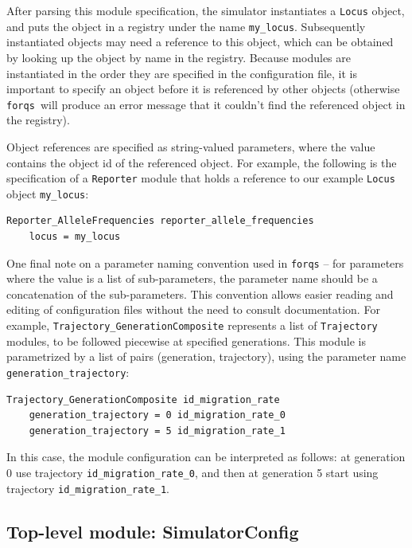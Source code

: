 \documentclass{article}
\newcommand{\forqs}[0]{\texttt{forqs }}
\begin{document}
After parsing this module specification, the simulator instantiates a
\texttt{Locus} object, and puts the object in a registry under the name
\texttt{my\_locus}.  Subsequently instantiated objects may need a reference to
this object, which can be obtained by looking up the object by name in the
registry.  Because modules are instantiated in the order they are specified in
the configuration file, it is important to specify an object before it is
referenced by other objects (otherwise \forqs will produce an error message
that it couldn't find the referenced object in the registry).

Object references are specified as string-valued parameters, where the value
contains the object id of the referenced object.  For example, the following is
the specification of a \texttt{Reporter} module that holds a reference to our
example \texttt{Locus} object \texttt{my\_locus}:
\begin{small}
\begin{verbatim}
Reporter_AlleleFrequencies reporter_allele_frequencies
    locus = my_locus
\end{verbatim}
\end{small}


One final note on a parameter naming convention used in \texttt{forqs} -- for
parameters where the value is a list of sub-parameters, the parameter name should be a
concatenation of the sub-parameters.  This convention allows easier reading
and editing of configuration files without the need to consult documentation.  
For example, \texttt{Trajectory\_GenerationComposite} represents a list of \texttt{Trajectory}
modules, to be followed piecewise at specified generations.  This module is 
parametrized by a list of pairs (generation, trajectory),
using the parameter name \texttt{generation\_trajectory}:
\begin{small}
\begin{verbatim}
Trajectory_GenerationComposite id_migration_rate
    generation_trajectory = 0 id_migration_rate_0
    generation_trajectory = 5 id_migration_rate_1
\end{verbatim}
\end{small}
In this case, the module configuration can be interpreted as follows: at
generation 0 use trajectory \texttt{id\_migration\_rate\_0}, and then at
generation 5 start using trajectory \texttt{id\_migration\_rate\_1}.


\subsection{Top-level module: SimulatorConfig}
\end{document}
